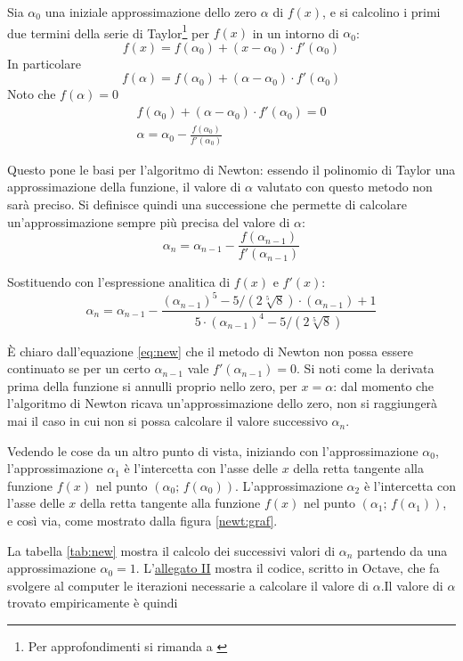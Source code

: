 Sia $\alpha_0$ una iniziale approssimazione dello zero $\alpha$ di $f(x)$, e si calcolino i primi due termini della serie di Taylor\footnote{Per approfondimenti si rimanda a \cite[128-130]{ele:mat}} per $f(x)$ in un intorno di $\alpha_0$:
\[
f(x)=f(\alpha_0)+(x-\alpha_0)\cdot f'(\alpha_0)
\]
In particolare
\[
f(\alpha)=f(\alpha_0)+(\alpha-\alpha_0)\cdot f'(\alpha_0)
\]
Noto che $f(\alpha)=0$
\begin{gather*}
f(\alpha_0)+(\alpha-\alpha_0)\cdot f'(\alpha_0)=0\\
\alpha=\alpha_0-\frac{f(\alpha_0)}{f'(\alpha_0)}
\end{gather*}

Questo pone le basi per l'algoritmo di Newton: essendo il polinomio di Taylor una approssimazione della funzione, il valore di $\alpha$ valutato con questo metodo non sarà preciso. Si definisce quindi una successione che permette di calcolare un'approssimazione sempre più precisa del valore di $\alpha$:
\begin{equation}
\alpha_n=\alpha_{n-1}-\frac{f(\alpha_{n-1})}{f'(\alpha_{n-1})}\label{eq:new}
\end{equation}

Sostituendo con l'espressione analitica di $f(x)$ e $f'(x)$:
\[
\alpha_n=\alpha_{n-1}-\frac{(\alpha_{n-1})^5-5/(2\sqrt[5]{8})\cdot (\alpha_{n-1})+1}{5\cdot(\alpha_{n-1})^4-5/(2\sqrt[5]{8})}
\]

È chiaro dall'equazione \eqref{eq:new} che il metodo di Newton non possa essere continuato se per un certo $\alpha_{n-1}$ vale $f'(\alpha_{n-1})=0$. Si noti come la derivata prima della funzione si annulli proprio nello zero, per $x=\alpha$: dal momento che l'algoritmo di Newton ricava un'approssimazione dello zero, non si raggiungerà mai il caso in cui non si possa calcolare il valore successivo $\alpha_n$.

Vedendo le cose da un altro punto di vista, iniziando con l'approssimazione $\alpha_0$, l'approssimazione $\alpha_1$ è l'intercetta con l'asse delle $x$ della retta tangente alla funzione $f(x)$ nel punto $(\alpha_0;\,f(\alpha_0))$. L'approssimazione $\alpha_2$ è l'intercetta con l'asse delle $x$ della retta tangente alla funzione $f(x)$ nel punto $(\alpha_1;\,f(\alpha_1))$, e così via, come mostrato dalla figura \ref{newt:graf}.

La tabella \ref{tab:new} mostra il calcolo dei successivi valori di $\alpha_n$ partendo da una approssimazione $\alpha_0=1$. L'\hyperref[all:2]{allegato II} mostra il codice, scritto in Octave, che fa svolgere al computer le iterazioni necessarie a calcolare il valore di $\alpha$.Il valore di $\alpha$ trovato empiricamente è quindi


